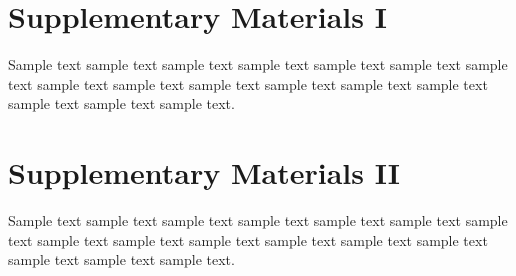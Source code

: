 \documentclass[11pt]{uonthesis}
\begin{document}
\begin{appendices}

\chapter{Supplementary Materials I}

Sample text sample text sample text sample text sample text sample
text sample text sample text sample text sample text sample text
sample text sample text sample text sample text sample text.

\chapter{Supplementary Materials II}

Sample text sample text sample text sample text sample text sample
text sample text sample text sample text sample text sample text
sample text sample text sample text sample text sample text.

\end{appendices}
\end{document}
